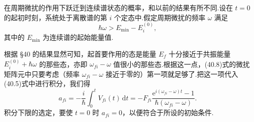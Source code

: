 在周期微扰的作用下跃迁到连续谱状态的概率，和以前的结果有所不同.设在 $t=0$ 的起初时刻，系统处于离散谱的第 $i$ 个定态中.假定周期微扰的频率 $\omega$ 满足
\begin{equation}
  \hbar\omega>E_{\min}-E_i^{(0)},
\end{equation}
其中的 $E_{\min}$ 为连续谱的起始能量值.

根据 §40 的结果显然可知，起首要作用的态是能量 $E_f$ 十分接近于共振能量 $E_i^{(0)}+\hbar\omega$ 的那些态，亦即 $\omega_{fi}-\omega$ 值很小的那些态.根据这一点，(40.8)式的微扰矩阵元中只要考虑（频率 $\omega_{fi}-\omega$ 接近于零的）第一项就足够了.把这一项代入(40.5)式中进行积分，我们得
\begin{equation}
  a_{fi}=-\frac{i}{\hbar}\int_0^{t}V_{fi}(t)\,\mathrm{d}t
  =-F_{fi}\frac{\mathrm{e}^{i(\omega_{fi}-\omega)t}-1}{\hbar(\omega_{fi}-\omega)}.
\end{equation}
积分下限的选定，要使 $t=0$ 时 $a_{fi}=0$，以便符合于所设的初始条件.

